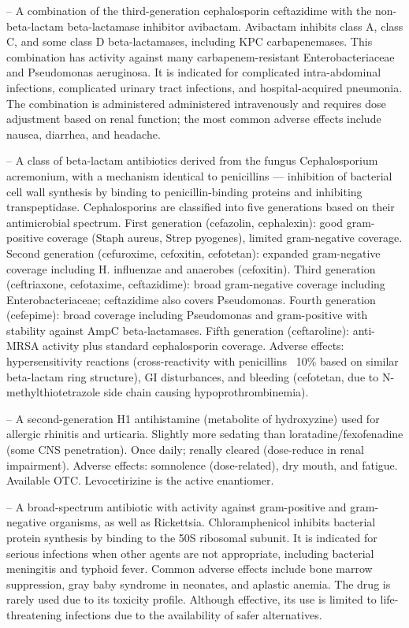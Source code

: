 -- A combination of the third-generation cephalosporin ceftazidime with the non-beta-lactam beta-lactamase inhibitor avibactam. Avibactam inhibits class A, class C, and some class D beta-lactamases, including KPC carbapenemases. This combination has activity against many carbapenem-resistant Enterobacteriaceae and Pseudomonas aeruginosa. It is indicated for complicated intra-abdominal infections, complicated urinary tract infections, and hospital-acquired pneumonia. The combination is administered administered intravenously and requires dose adjustment based on renal function; the most common adverse effects include nausea, diarrhea, and headache.

-- A class of beta-lactam antibiotics derived from the fungus Cephalosporium acremonium, with a mechanism identical to penicillins — inhibition of bacterial cell wall synthesis by binding to penicillin-binding proteins and inhibiting transpeptidase. Cephalosporins are classified into five generations based on their antimicrobial spectrum. First generation (cefazolin, cephalexin): good gram-positive coverage (Staph aureus, Strep pyogenes), limited gram-negative coverage. Second generation (cefuroxime, cefoxitin, cefotetan): expanded gram-negative coverage including H. influenzae and anaerobes (cefoxitin). Third generation (ceftriaxone, cefotaxime, ceftazidime): broad gram-negative coverage including Enterobacteriaceae; ceftazidime also covers Pseudomonas. Fourth generation (cefepime): broad coverage including Pseudomonas and gram-positive with stability against AmpC beta-lactamases. Fifth generation (ceftaroline): anti-MRSA activity plus standard cephalosporin coverage. Adverse effects: hypersensitivity reactions (cross-reactivity with penicillins ~10\% based on similar beta-lactam ring structure), GI disturbances, and bleeding (cefotetan, due to N-methylthiotetrazole side chain causing hypoprothrombinemia).

-- A second-generation H1 antihistamine (metabolite of hydroxyzine) used for allergic rhinitis and urticaria. Slightly more sedating than loratadine/fexofenadine (some CNS penetration). Once daily; renally cleared (dose-reduce in renal impairment). Adverse effects: somnolence (dose-related), dry mouth, and fatigue. Available OTC. Levocetirizine is the active enantiomer.

-- A broad-spectrum antibiotic with activity against gram-positive and gram-negative organisms, as well as Rickettsia. Chloramphenicol inhibits bacterial protein synthesis by binding to the 50S ribosomal subunit. It is indicated for serious infections when other agents are not appropriate, including bacterial meningitis and typhoid fever. Common adverse effects include bone marrow suppression, gray baby syndrome in neonates, and aplastic anemia. The drug is rarely used due to its toxicity profile. Although effective, its use is limited to life-threatening infections due to the availability of safer alternatives.

